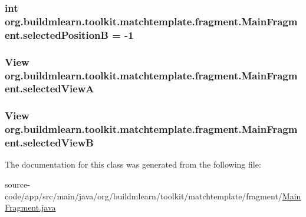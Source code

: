 \subsubsection[{\texorpdfstring{selected\+PositionB}{selectedPositionB}}]{\setlength{\rightskip}{0pt plus 5cm}int org.\+buildmlearn.\+toolkit.\+matchtemplate.\+fragment.\+Main\+Fragment.\+selected\+PositionB = -\/1\hspace{0.3cm}{\ttfamily [private]}}\hypertarget{classorg_1_1buildmlearn_1_1toolkit_1_1matchtemplate_1_1fragment_1_1MainFragment_a551644e1a207590d8f911431584586c7}{}\label{classorg_1_1buildmlearn_1_1toolkit_1_1matchtemplate_1_1fragment_1_1MainFragment_a551644e1a207590d8f911431584586c7}
\subsubsection[{\texorpdfstring{selected\+ViewA}{selectedViewA}}]{\setlength{\rightskip}{0pt plus 5cm}View org.\+buildmlearn.\+toolkit.\+matchtemplate.\+fragment.\+Main\+Fragment.\+selected\+ViewA\hspace{0.3cm}{\ttfamily [private]}}\hypertarget{classorg_1_1buildmlearn_1_1toolkit_1_1matchtemplate_1_1fragment_1_1MainFragment_a3f22f954fc1bfa2c30f3440a9bbaad62}{}\label{classorg_1_1buildmlearn_1_1toolkit_1_1matchtemplate_1_1fragment_1_1MainFragment_a3f22f954fc1bfa2c30f3440a9bbaad62}
\subsubsection[{\texorpdfstring{selected\+ViewB}{selectedViewB}}]{\setlength{\rightskip}{0pt plus 5cm}View org.\+buildmlearn.\+toolkit.\+matchtemplate.\+fragment.\+Main\+Fragment.\+selected\+ViewB\hspace{0.3cm}{\ttfamily [private]}}\hypertarget{classorg_1_1buildmlearn_1_1toolkit_1_1matchtemplate_1_1fragment_1_1MainFragment_aaa087f0b8191aecc84b89b60415743cc}{}\label{classorg_1_1buildmlearn_1_1toolkit_1_1matchtemplate_1_1fragment_1_1MainFragment_aaa087f0b8191aecc84b89b60415743cc}


The documentation for this class was generated from the following file\+:\begin{DoxyCompactItemize}
\item 
source-\/code/app/src/main/java/org/buildmlearn/toolkit/matchtemplate/fragment/\hyperlink{matchtemplate_2fragment_2MainFragment_8java}{Main\+Fragment.\+java}\end{DoxyCompactItemize}
